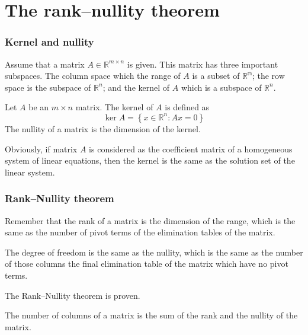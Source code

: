 \section{The rank--nullity theorem}
\begin{frame}\frametitle{Kernel and nullity}
    Assume that a matrix $A\in\mathbb{R}^{m\times n}$ is given.
    This matrix has three important subspaces.
    The column space which the range of $A$ is a subset of $\mathbb{R^m}$; 
    the row space is the subspace of $\mathbb{R}^n$; 
    and the kernel of $A$ which is a subspace of $\mathbb{R}^n$.
    \begin{definition}
        Let $A$ be an $m\times n$ matrix.
        The \alert{kernel of }$A$ is defined as
        \[
            \ker{A}=\left\{ x\in\mathbb{R}^n: Ax=0 \right\}
        \]
        The \alert{nullity} of a matrix is the dimension of the kernel.
    \end{definition}
    Obviously, if matrix $A$ is considered as the coefficient matrix of a homogeneous system of linear equations,
    then the kernel is the same as the solution set of the linear system.
\end{frame}
\begin{frame}\frametitle{Rank--Nullity theorem}
    Remember that the rank of a matrix is the dimension of the range,
    which is the same as the number of pivot terms of the elimination tables of the matrix.

    The degree of freedom is the same as the nullity, 
    which is the same as the number of those columns the final 
    elimination table of the matrix which have no pivot terms.

    The Rank--Nullity theorem is proven.
    \begin{theorem}
        The number of columns of a matrix is the sum of the rank and the nullity of the matrix.
    \end{theorem}
\end{frame}



